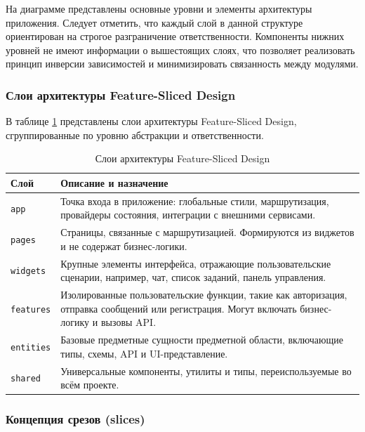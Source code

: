 На диаграмме представлены основные уровни и элементы архитектуры приложения. Следует отметить, что каждый слой в данной структуре ориентирован на строгое разграничение ответственности. Компоненты нижних уровней не имеют информации о вышестоящих слоях, что позволяет реализовать принцип инверсии зависимостей и минимизировать связанность между модулями.

\subsubsection{Слои архитектуры Feature-Sliced Design}

В таблице \ref{tab:fsd-layers} представлены слои архитектуры Feature-Sliced Design, сгруппированные по уровню абстракции и ответственности.

\begin{table}[H]
  \centering
  \caption{Слои архитектуры Feature-Sliced Design}
  \label{tab:fsd-layers}
  \begin{tabular}{|p{3cm}|p{11cm}|}
    \hline
    \textbf{Слой} & \textbf{Описание и назначение} \\ \hline
    \texttt{app}      & Точка входа в приложение: глобальные стили, маршрутизация, провайдеры состояния, интеграции с внешними сервисами. \\ \hline
    \texttt{pages}    & Страницы, связанные с маршрутизацией. Формируются из виджетов и не содержат бизнес-логики. \\ \hline
    \texttt{widgets}  & Крупные элементы интерфейса, отражающие пользовательские сценарии, например, чат, список заданий, панель управления. \\ \hline
    \texttt{features}& Изолированные пользовательские функции, такие как авторизация, отправка сообщений или регистрация. Могут включать бизнес-логику и вызовы API. \\ \hline
    \texttt{entities} & Базовые предметные сущности предметной области, включающие типы, схемы, API и UI-представление. \\ \hline
    \texttt{shared}   & Универсальные компоненты, утилиты и типы, переиспользуемые во всём проекте. \\ \hline
  \end{tabular}
\end{table}

\subsubsection{Концепция срезов (slices)}

